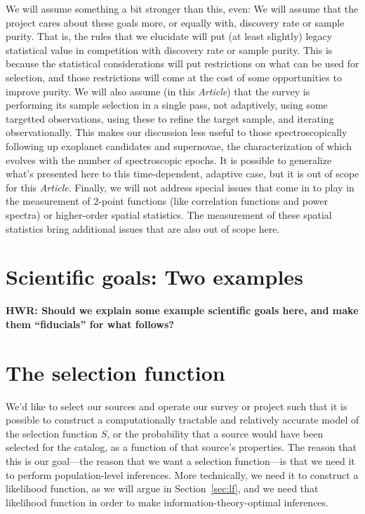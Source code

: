 \documentclass[modern]{aastex62}
\newcommand{\documentname}{\textsl{Article}}
\newcommand{\sectionname}{Section}
\begin{document}
We will assume something a bit stronger than this, even:
We will assume that the project cares about these goals more,
or equally with, discovery rate or sample purity.
That is, the rules that we elucidate will put (at least slightly)
legacy statistical value in competition with discovery rate or sample
purity.
This is because the statistical considerations will put restrictions
on what can be used for selection, and those restrictions will come at
the cost of some opportunities to improve purity.
We will also assume (in this \documentname) that the survey is performing
its sample selection in a single pass, not adaptively, using some
targetted observations, using these to refine the target sample, and
iterating observationally.
This makes our discussion less useful to those spectroscopically following up exoplanet
candidates and supernovae, the characterization of which evolves with
the number of spectroscopic epochs.
It is possible to generalize what's presented here to this time-dependent, adaptive
case, but it is out of scope for this \documentname.
Finally, we will not address special issues that come in to play in the
measurement of 2-point functions (like correlation functions and power
spectra) or higher-order spatial statistics.
The measurement of these spatial statistics bring additional issues
that are also out of scope here.

\section{Scientific goals: Two examples}

\textbf{HWR: Should we explain some example scientific goals here, and make
them ``fiducials'' for what follows?}

\section{The selection function}\label{sec:sf}

We'd like to select our sources and operate our survey or project such
that it is possible to construct a computationally tractable and
relatively accurate model of the selection function $S$, or the
probability that a source would have been selected for the catalog, as
a function of that source's properties.
The reason that this is our goal---the reason that we want a selection
function---is that we need it to perform population-level inferences.
More technically, we need it to construct a likelihood function, as we
will argue in \sectionname~\ref{sec:lf}, and we need that likelihood
function in order to make information-theory-optimal inferences.
\end{document}
